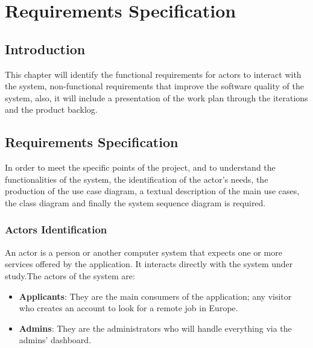 \documentclass[../main.tex]{subfiles}
\begin{document}
\chapter{Requirements Specification}
\section{Introduction}
This chapter will identify the functional requirements for actors to interact with the system, non-functional requirements that improve the software quality of the system, also, it will include a presentation of the work plan through the iterations and the product backlog.
\section{Requirements Specification}
In order to meet the specific points of the project, and to understand the functionalities of the system, the identification of the actor's needs, the production of the use case diagram, a textual description of the main use cases, the class diagram and finally the system sequence diagram is required.
\subsection{Actors Identification}
An actor is a person or another computer system that expects one or more services offered by the application. It interacts directly with the system under study.\newline The actors of the system are:
\begin{itemize}
  \item \textbf{Applicants}: They are the main consumers of the application; any visitor who creates an account to look for a remote job in Europe.
  \item \textbf{Admins}: They are the administrators who will handle everything via the admins' dashboard.
\end{itemize}
\newpage
\end{document}
